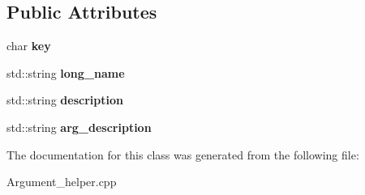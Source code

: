 \subsection*{Public Attributes}
\begin{DoxyCompactItemize}
\item 
\hypertarget{classdsr_1_1_argument__helper_1_1_argument__target_a3cc92480d2fcb208164e63907cb6e87e}{
char {\bfseries key}}
\label{classdsr_1_1_argument__helper_1_1_argument__target_a3cc92480d2fcb208164e63907cb6e87e}

\item 
\hypertarget{classdsr_1_1_argument__helper_1_1_argument__target_a6aa32e96af30ba3e4139876c07af96b2}{
std::string {\bfseries long\_\-name}}
\label{classdsr_1_1_argument__helper_1_1_argument__target_a6aa32e96af30ba3e4139876c07af96b2}

\item 
\hypertarget{classdsr_1_1_argument__helper_1_1_argument__target_a0ff169144da0b246ecf6d8980d60a7b1}{
std::string {\bfseries description}}
\label{classdsr_1_1_argument__helper_1_1_argument__target_a0ff169144da0b246ecf6d8980d60a7b1}

\item 
\hypertarget{classdsr_1_1_argument__helper_1_1_argument__target_afef131ac78b225c4f008264c3e50e23b}{
std::string {\bfseries arg\_\-description}}
\label{classdsr_1_1_argument__helper_1_1_argument__target_afef131ac78b225c4f008264c3e50e23b}

\end{DoxyCompactItemize}


The documentation for this class was generated from the following file:\begin{DoxyCompactItemize}
\item 
Argument\_\-helper.cpp\end{DoxyCompactItemize}

